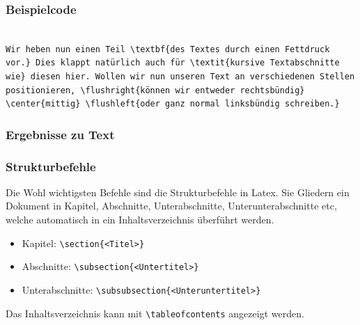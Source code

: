 \begin{frame}[fragile]
\frametitle{Beispielcode}
 \begin{lstlisting}[style=Latex]

Wir heben nun einen Teil \textbf{des Textes durch einen Fettdruck vor.} Dies klappt natürlich auch für \textit{kursive Textabschnitte wie} diesen hier. Wollen wir nun unseren Text an verschiedenen Stellen positionieren, \flushright{können wir entweder rechtsbündig} \center{mittig} \flushleft{oder ganz normal linksbündig schreiben.} 

\end{lstlisting} 
\end{frame}
\begin{frame}[fragile]
\frametitle{Ergebnisse zu Text}
\end{frame}

\begin{frame}[fragile]
\frametitle{Strukturbefehle}
\linespread{1.5}
Die Wohl wichtigsten Befehle sind die Strukturbefehle in Latex. Sie Gliedern ein Dokument in Kapitel, Abschnitte, Unterabschnitte, Unterunterabschnitte etc, welche automatisch in ein Inhaltsverzeichnis überführt werden.
\begin{itemize}[<+->]
  \item Kapitel: \lstinline[style=Latex]+\section{<Titel>}+ \\
  \item Abschnitte:  \lstinline[style=Latex]+\subsection{<Untertitel>}+ 
  \item Unterabschnitte:  \lstinline[style=Latex]+\subsubsection{<Unteruntertitel>}+
\end{itemize}
Das Inhaltsverzeichnis kann mit \lstinline[style=Latex]+\tableofcontents+ angezeigt werden.
\end{frame}

